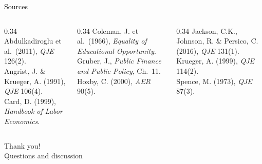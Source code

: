 \documentclass[11pt,aspectratio=169]{beamer}
\begin{document}
\begin{frame}{Sources}
  \tiny
  \begin{columns}[T]
    \begin{column}{0.34\textwidth}
      Abdulkadiroglu et al.\ (2011), \emph{QJE} 126(2).\\
      Angrist, J. \& Krueger, A. (1991), \emph{QJE} 106(4).\\
      Card, D. (1999), \emph{Handbook of Labor Economics}.
    \end{column}
    \begin{column}{0.34\textwidth}
      Coleman, J. et al.\ (1966), \emph{Equality of Educational Opportunity}.\\
      Gruber, J., \emph{Public Finance and Public Policy}, Ch.\ 11.\\
      Hoxby, C. (2000), \emph{AER} 90(5).
    \end{column}
    \begin{column}{0.34\textwidth}
      Jackson, C.K., Johnson, R. \& Persico, C. (2016), \emph{QJE} 131(1).\\
      Krueger, A. (1999), \emph{QJE} 114(2).\\
      Spence, M. (1973), \emph{QJE} 87(3).
    \end{column}
  \end{columns}
\end{frame}

\begin{frame}[standout]
  Thank you!\\
  \vspace{0.5em}
  \small Questions and discussion
\end{frame}
\end{document}
